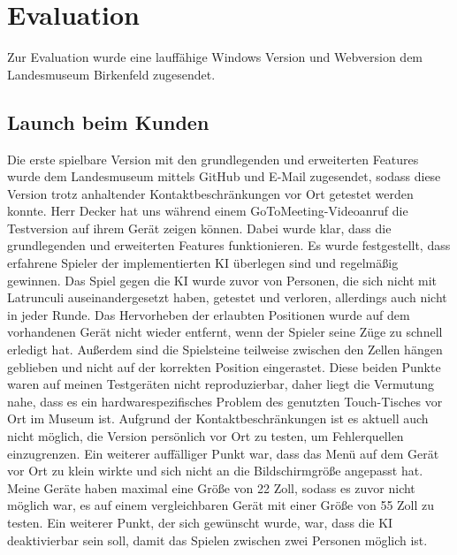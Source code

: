 
\chapter{Evaluation}
\label{ch:Evaluierung}
Zur Evaluation wurde eine lauffähige Windows Version und Webversion dem Landesmuseum Birkenfeld zugesendet.

\section{Launch beim Kunden}
\label{ch:Evaluierung:sec:Launch}
Die erste spielbare Version mit den grundlegenden und erweiterten Features wurde dem Landesmuseum mittels GitHub und E-Mail zugesendet, sodass diese Version trotz anhaltender Kontaktbeschränkungen vor Ort getestet werden konnte. Herr Decker hat uns während einem GoToMeeting-Videoanruf die Testversion auf ihrem Gerät zeigen können. Dabei wurde klar, dass die grundlegenden und erweiterten Features funktionieren. Es wurde festgestellt, dass erfahrene Spieler der implementierten KI überlegen sind und regelmäßig gewinnen. Das Spiel gegen die KI wurde zuvor von Personen, die sich nicht mit Latrunculi auseinandergesetzt haben, getestet und verloren, allerdings auch nicht in jeder Runde. Das Hervorheben der erlaubten Positionen wurde auf dem vorhandenen Gerät nicht wieder entfernt, wenn der Spieler seine Züge zu schnell erledigt hat. Außerdem sind die Spielsteine teilweise zwischen den Zellen hängen geblieben und nicht auf der korrekten Position eingerastet. Diese beiden Punkte waren auf meinen Testgeräten nicht reproduzierbar, daher liegt die Vermutung nahe, dass es ein hardwarespezifisches Problem des genutzten Touch-Tisches vor Ort im Museum ist. Aufgrund der Kontaktbeschränkungen ist es aktuell auch nicht möglich, die Version persönlich vor Ort zu testen, um Fehlerquellen einzugrenzen. Ein weiterer auffälliger Punkt war, dass das Menü auf dem Gerät vor Ort zu klein wirkte und sich nicht an die Bildschirmgröße angepasst hat. Meine Geräte haben maximal eine Größe von 22 Zoll, sodass es zuvor nicht möglich war, es auf einem vergleichbaren Gerät mit einer Größe von 55 Zoll zu testen.
Ein weiterer Punkt, der sich gewünscht wurde, war, dass die KI deaktivierbar sein soll, damit das Spielen zwischen zwei Personen möglich ist.


